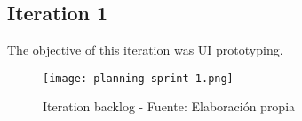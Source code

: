 \subsection{Iteration 1}
The objective of this iteration was UI prototyping.

\begin{figure}[H]
    \centering
    \texttt{[image: planning-sprint-1.png]}
    \caption{Iteration backlog - Fuente: Elaboración propia}
    \label{fig:sprint1-backlog}
\end{figure}
